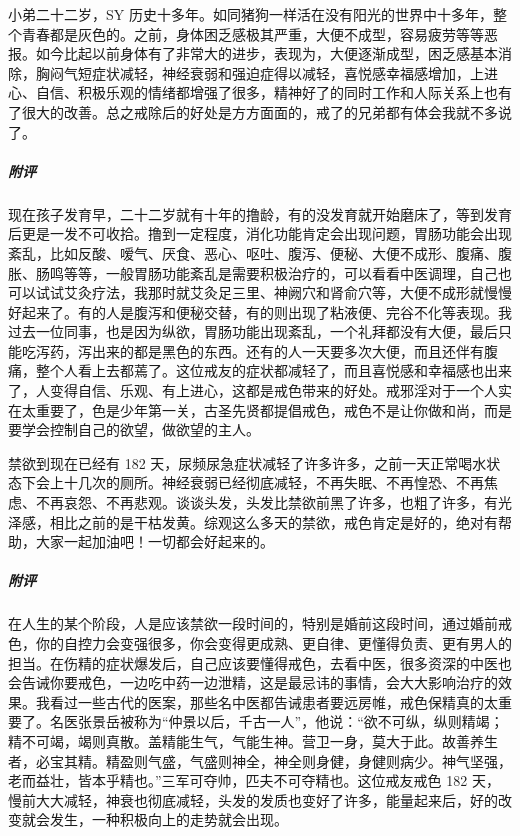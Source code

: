 \begin{case}[神经衰弱]
    小弟二十二岁，SY 历史十多年。如同猪狗一样活在没有阳光的世界中十多年，整个青春都是灰色的。之前，身体困乏感极其严重，大便不成型，容易疲劳等等恶报。如今比起以前身体有了非常大的进步，表现为，大便逐渐成型，困乏感基本消除，胸闷气短症状减轻，神经衰弱和强迫症得以减轻，喜悦感幸福感增加，上进心、自信、积极乐观的情绪都增强了很多，精神好了的同时工作和人际关系上也有了很大的改善。总之戒除后的好处是方方面面的，戒了的兄弟都有体会我就不多说了。
    \subparagraph{附评} 现在孩子发育早，二十二岁就有十年的撸龄，有的没发育就开始磨床了，等到发育后更是一发不可收拾。撸到一定程度，消化功能肯定会出现问题，胃肠功能会出现紊乱，比如反酸、嗳气、厌食、恶心、呕吐、腹泻、便秘、大便不成形、腹痛、腹胀、肠鸣等等，一般胃肠功能紊乱是需要积极治疗的，可以看看中医调理，自己也可以试试艾灸疗法，我那时就艾灸足三里、神阙穴和肾俞穴等，大便不成形就慢慢好起来了。有的人是腹泻和便秘交替，有的则出现了粘液便、完谷不化等表现。我过去一位同事，也是因为纵欲，胃肠功能出现紊乱，一个礼拜都没有大便，最后只能吃泻药，泻出来的都是黑色的东西。还有的人一天要多次大便，而且还伴有腹痛，整个人看上去都蔫了。这位戒友的症状都减轻了，而且喜悦感和幸福感也出来了，人变得自信、乐观、有上进心，这都是戒色带来的好处。戒邪淫对于一个人实在太重要了，色是少年第一关，古圣先贤都提倡戒色，戒色不是让你做和尚，而是要学会控制自己的欲望，做欲望的主人。
\end{case}

\begin{case}[神经衰弱]
    禁欲到现在已经有 182 天，尿频尿急症状减轻了许多许多，之前一天正常喝水状态下会上十几次的厕所。神经衰弱已经彻底减轻，不再失眠、不再惶恐、不再焦虑、不再哀怨、不再悲观。谈谈头发，头发比禁欲前黑了许多，也粗了许多，有光泽感，相比之前的是干枯发黄。综观这么多天的禁欲，戒色肯定是好的，绝对有帮助，大家一起加油吧！一切都会好起来的。
    \subparagraph{附评} 在人生的某个阶段，人是应该禁欲一段时间的，特别是婚前这段时间，通过婚前戒色，你的自控力会变强很多，你会变得更成熟、更自律、更懂得负责、更有男人的担当。在伤精的症状爆发后，自己应该要懂得戒色，去看中医，很多资深的中医也会告诫你要戒色，一边吃中药一边泄精，这是最忌讳的事情，会大大影响治疗的效果。我看过一些古代的医案，那些名中医都告诫患者要远房帷，戒色保精真的太重要了。名医张景岳被称为“仲景以后，千古一人”，他说：“欲不可纵，纵则精竭；精不可竭，竭则真散。盖精能生气，气能生神。营卫一身，莫大于此。故善养生者，必宝其精。精盈则气盛，气盛则神全，神全则身健，身健则病少。神气坚强，老而益壮，皆本乎精也。”三军可夺帅，匹夫不可夺精也。这位戒友戒色 182 天，慢前大大减轻，神衰也彻底减轻，头发的发质也变好了许多，能量起来后，好的改变就会发生，一种积极向上的走势就会出现。
\end{case}

